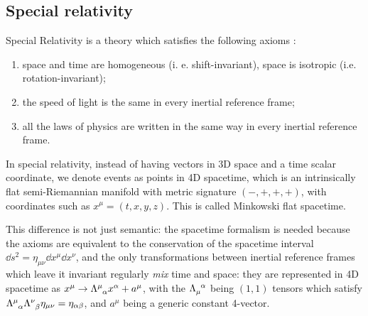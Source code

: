 \documentclass[main.tex]{subfiles}
\begin{document}
%
%
%
%
%

\subsection{Special relativity}

Special Relativity is a theory which satisfies the following axioms \cite[]{Lechner:2014}:

\begin{enumerate}
    \item space and time are homogeneous (i. e. shift-invariant), space is isotropic (i.e. rotation-invariant);
    \item the speed of light is the same in every inertial reference frame;
    \item all the laws of physics are written in the same way in every inertial reference frame.
\end{enumerate}

In special relativity, instead of having vectors in 3D space and a time scalar coordinate, we denote events as points in 4D spacetime, which is an intrinsically flat semi-Riemannian manifold with metric signature \((-, +, +, +)\), with coordinates such as \(x^\mu = (t, x, y, z)\).
This is called Minkowski flat spacetime.

This difference is not just semantic: the spacetime formalism is needed because the axioms are equivalent to the conservation of the spacetime interval \(\dd{s}^2 = \eta_{\mu\nu} \dd{x}^\mu\dd{x}^\nu\), and the only transformations between inertial reference frames which leave it invariant regularly \emph{mix} time and space:
they are  represented in 4D spacetime as \(x^\mu \rightarrow \Lambda\indices{^\mu_\alpha} x^\alpha + a^\mu\), with the \(\Lambda\indices{_\mu^\alpha}\) being \((1,1)\) tensors which satisfy \(\Lambda\indices{^\mu_\alpha} \Lambda\indices{^\nu_\beta} \eta_{\mu\nu} = \eta_{\alpha \beta}\), and \(a^\mu\) being a generic constant 4-vector.
\end{document}

